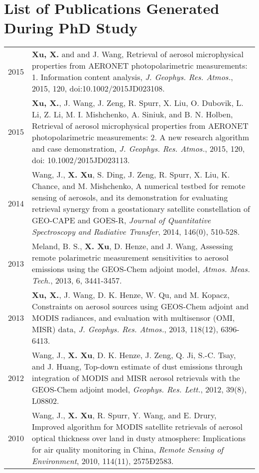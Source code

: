 \chapter{List of Publications Generated During PhD Study}

\begingroup
\onehalfspacing
\begin{longtable}{p{0.5in} p{5.0in}}
 2015 & \textbf{Xu, X.} and and J. Wang, Retrieval of aerosol
microphysical properties from AERONET photopolarimetric measurements:
1. Information content analysis, \textit{J. Geophys. Res. Atmos.}, 2015,
120, doi:10.1002/2015JD023108. \\
 2015 & \textbf{Xu, X.},  J. Wang, J. Zeng, R. Spurr, X. Liu, O. Dubovik,
L. Li, Z. Li, M. I. Mishchenko, A. Siniuk, and B. N. Holben, Retrieval of
aerosol microphysical properties from AERONET photopolarimetric
measurements: 2. A new research algorithm and case demonstration,
\textit{J. Geophys. Res. Atmos.}, 2015, 120, doi: 10.1002/2015JD023113.\\
2014 & Wang, J., \textbf{X. Xu}, S. Ding, J. Zeng, R. Spurr, X. Liu, K. Chance, 
and M. Mishchenko, A numerical testbed for remote sensing of aerosols, and its
demonstration for evaluating retrieval synergy from a geostationary satellite
constellation of GEO-CAPE and GOES-R, \textit{Journal of Quantitative
Spectroscopy and Radiative Transfer}, 2014, 146(0), 510-528. \\
2013 & Meland, B. S., \textbf{X. Xu}, D. Henze, and J. Wang, Assessing
remote polarimetric measurement sensitivities to aerosol emissions using
the GEOS-Chem adjoint model, \textit{Atmos. Meas. Tech.}, 2013, 6, 3441-3457.
\\
2013 & \textbf{Xu, X.}, J. Wang, D. K. Henze, W. Qu, and M. Kopacz,
Constraints on aerosol sources using GEOS-Chem adjoint and MODIS
radiances, and evaluation with multisensor (OMI, MISR) data, \textit{J.
Geophys. Res. Atmos.}, 2013, 118(12), 6396-6413. \\
2012 & Wang, J., \textbf{X. Xu}, D. K. Henze, J. Zeng, Q. Ji, S.-C.
Tsay, and J. Huang, Top-down estimate of dust emissions through
integration of MODIS and MISR aerosol retrievals with the GEOS-Chem
adjoint model, \textit{Geophys. Res. Lett.}, 2012, 39(8), L08802. \\
2010 & Wang, J., \textbf{X. Xu}, R. Spurr, Y. Wang, and E. Drury,
Improved algorithm for MODIS satellite retrievals of aerosol optical
thickness over land in dusty atmosphere: Implications for air quality
monitoring in China, \textit{Remote Sensing of Environment}, 2010, 114(11),
2575Ð2583. \\
\end{longtable}
\endgroup

